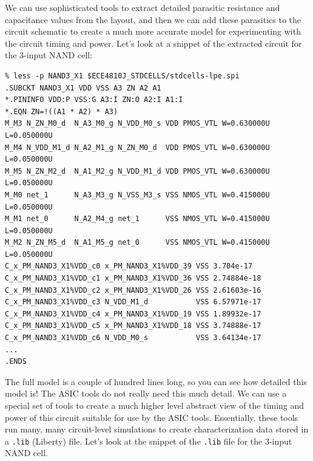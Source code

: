 \documentclass[a4paper,12pt,twoside]{article}
\begin{document}
We can use sophisticated tools to extract detailed parasitic resistance and capacitance values from the layout, and then we can add these parasitics to the circuit schematic to create a much more accurate model for experimenting with the circuit timing and power. Let’s look at a snippet of the extracted circuit for the 3-input NAND cell:
\begin{verbatim}
% less -p NAND3_X1 $ECE4810J_STDCELLS/stdcells-lpe.spi
.SUBCKT NAND3_X1 VDD VSS A3 ZN A2 A1
*.PININFO VDD:P VSS:G A3:I ZN:O A2:I A1:I
*.EQN ZN=!((A1 * A2) * A3)
M_M3 N_ZN_M0_d  N_A3_M0_g N_VDD_M0_s VDD PMOS_VTL W=0.630000U L=0.050000U
M_M4 N_VDD_M1_d N_A2_M1_g N_ZN_M0_d  VDD PMOS_VTL W=0.630000U L=0.050000U
M_M5 N_ZN_M2_d  N_A1_M2_g N_VDD_M1_d VDD PMOS_VTL W=0.630000U L=0.050000U
M_M0 net_1      N_A3_M3_g N_VSS_M3_s VSS NMOS_VTL W=0.415000U L=0.050000U
M_M1 net_0      N_A2_M4_g net_1      VSS NMOS_VTL W=0.415000U L=0.050000U
M_M2 N_ZN_M5_d  N_A1_M5_g net_0      VSS NMOS_VTL W=0.415000U L=0.050000U
C_x_PM_NAND3_X1%VDD_c0 x_PM_NAND3_X1%VDD_39 VSS 3.704e-17
C_x_PM_NAND3_X1%VDD_c1 x_PM_NAND3_X1%VDD_36 VSS 2.74884e-18
C_x_PM_NAND3_X1%VDD_c2 x_PM_NAND3_X1%VDD_26 VSS 2.61603e-16
C_x_PM_NAND3_X1%VDD_c3 N_VDD_M1_d           VSS 6.57971e-17
C_x_PM_NAND3_X1%VDD_c4 x_PM_NAND3_X1%VDD_19 VSS 1.89932e-17
C_x_PM_NAND3_X1%VDD_c5 x_PM_NAND3_X1%VDD_18 VSS 3.74888e-17
C_x_PM_NAND3_X1%VDD_c6 N_VDD_M0_s           VSS 3.64134e-17
...
.ENDS
\end{verbatim}
The full model is a couple of hundred lines long, so you can see how detailed this model is! The ASIC tools do not really need this much detail. We can use a special set of tools to create a much higher level abstract view of the timing and power of this circuit suitable for use by the ASIC tools. Essentially, these tools run many, many circuit-level simulations to create characterization data stored in a \texttt{.lib} (Liberty) file. Let’s look at the snippet of the \texttt{.lib} file for the 3-input NAND cell.
\end{document}
